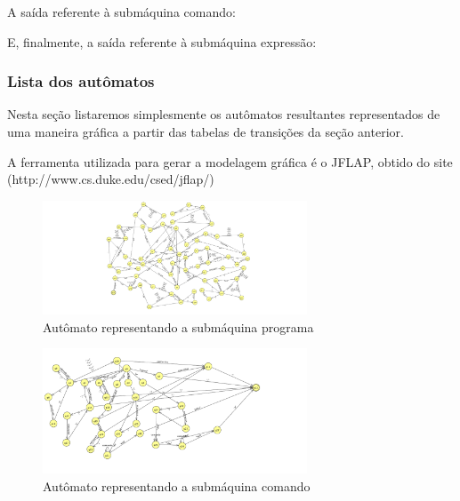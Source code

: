       A saída referente à submáquina comando:

      

      
      E, finalmente, a saída referente à submáquina expressão:

      

    \subsubsection{Lista dos autômatos}

      Nesta seção listaremos simplesmente os autômatos resultantes representados de uma maneira gráfica a partir das tabelas de transições da seção anterior.


      A ferramenta utilizada para gerar a modelagem gráfica é o JFLAP, obtido do site (http://www.cs.duke.edu/csed/jflap/)


      \begin{figure}[H]
        \caption{Autômato representando a submáquina programa}
        \centering
          \includegraphics[width=0.7\textwidth]{../1-linguagem/notacoes/JFLAP/programa/programa.png}
      \end{figure}

      \begin{figure}[H]
        \caption{Autômato representando a submáquina comando}
        \centering
          \includegraphics[width=0.7\textwidth]{../1-linguagem/notacoes/JFLAP/comando/comando.png}
      \end{figure}


